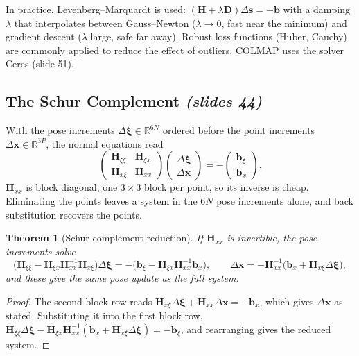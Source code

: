 \documentclass[11pt,a4paper]{article}
\newcommand{\slr}[1]{\texorpdfstring{\emph{(slides #1)}}{(slides #1)}}
\newcommand{\R}{\mathbb{R}}
\theoremstyle{definition}
\theoremstyle{plain}
\newtheorem{theorem}[definition]{Theorem}
\theoremstyle{remark}
\begin{document}
\begin{beyond}
In practice, Levenberg--Marquardt is used: $(\bm H+\lambda\bm D)\Delta\bm s=-\bm b$ with a damping $\lambda$ that interpolates between Gauss--Newton ($\lambda\to0$, fast near the minimum) and gradient descent ($\lambda$ large, safe far away). Robust loss functions (Huber, Cauchy) are commonly applied to reduce the effect of outliers. COLMAP uses the solver Ceres (slide 51).
\end{beyond}

\subsection{The Schur Complement \slr{44}}
With the pose increments $\Delta\bm\xi\in\R^{6N}$ ordered before the point increments $\Delta\bm x\in\R^{3P}$, the normal equations read
\[
\begin{pmatrix}\bm H_{\xi\xi}&\bm H_{\xi x}\\\bm H_{x\xi}&\bm H_{xx}\end{pmatrix}\begin{pmatrix}\Delta\bm\xi\\\Delta\bm x\end{pmatrix}=-\begin{pmatrix}\bm b_\xi\\\bm b_x\end{pmatrix}.
\]
$\bm H_{xx}$ is block diagonal, one $3\times3$ block per point, so its inverse is cheap. Eliminating the points leaves a system in the $6N$ pose increments alone, and back substitution recovers the points.

\begin{theorem}[Schur complement reduction]\label{thm:schur}
If $\bm H_{xx}$ is invertible, the pose increments solve
\[
\bigl(\bm H_{\xi\xi}-\bm H_{\xi x}\bm H_{xx}^{-1}\bm H_{x\xi}\bigr)\Delta\bm\xi=-\bigl(\bm b_\xi-\bm H_{\xi x}\bm H_{xx}^{-1}\bm b_x\bigr),
\qquad
\Delta\bm x=-\bm H_{xx}^{-1}\bigl(\bm b_x+\bm H_{x\xi}\Delta\bm\xi\bigr),
\]
and these give the same pose update as the full system.
\end{theorem}
\begin{proof}
The second block row reads $\bm H_{x\xi}\Delta\bm\xi+\bm H_{xx}\Delta\bm x=-\bm b_x$, which gives $\Delta\bm x$ as stated. Substituting it into the first block row,
$\bm H_{\xi\xi}\Delta\bm\xi-\bm H_{\xi x}\bm H_{xx}^{-1}(\bm b_x+\bm H_{x\xi}\Delta\bm\xi)=-\bm b_\xi$, and rearranging gives the reduced system.
\end{proof}
\end{document}
